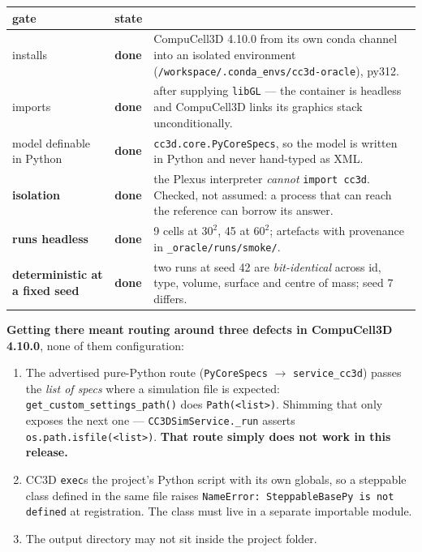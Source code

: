 \documentclass[11pt,a4paper]{article}
\newcommand{\code}[1]{\texttt{#1}}
\newcommand{\dn}{\textcolor{good}{\textbf{done}}}
\begin{document}
\begin{center}
\small
\begin{tabular}{@{}l l p{8.4cm}@{}}
\toprule
\textbf{gate} & \textbf{state} & \\
\midrule
installs & \dn & CompuCell3D 4.10.0 from its own conda channel into an isolated environment
(\code{/workspace/.conda\_envs/cc3d-oracle}), py312.\\
imports & \dn & after supplying \code{libGL} --- the container is headless and CompuCell3D links
its graphics stack unconditionally.\\
model definable in Python & \dn & \code{cc3d.core.PyCoreSpecs}, so the model is written in Python
and never hand-typed as XML.\\
\textbf{isolation} & \dn & the Plexus interpreter \emph{cannot} \code{import cc3d}. Checked, not
assumed: a process that can reach the reference can borrow its answer.\\
\textbf{runs headless} & \dn & 9 cells at $30^2$, 45 at $60^2$; artefacts with provenance in
\code{\_oracle/runs/smoke/}.\\
\textbf{deterministic at a fixed seed} & \dn & two runs at seed 42 are \emph{bit-identical} across
id, type, volume, surface and centre of mass; seed 7 differs.\\
\bottomrule
\end{tabular}
\end{center}

\textbf{Getting there meant routing around three defects in CompuCell3D 4.10.0}, none of them
configuration:

\begin{enumerate}[leftmargin=1.4em,itemsep=1pt]
\item The advertised pure-Python route (\code{PyCoreSpecs} $\to$ \code{service\_cc3d}) passes the
\emph{list of specs} where a simulation file is expected:
\code{get\_custom\_settings\_path()} does \code{Path(<list>)}. Shimming that only exposes the next
one --- \code{CC3DSimService.\_run} asserts \code{os.path.isfile(<list>)}. \textbf{That route
simply does not work in this release.}
\item CC3D \code{exec}s the project's Python script with its own globals, so a steppable class
defined in the same file raises \code{NameError: SteppableBasePy is not defined} at registration.
The class must live in a separate importable module.
\item The output directory may not sit inside the project folder.
\end{enumerate}
\end{document}
